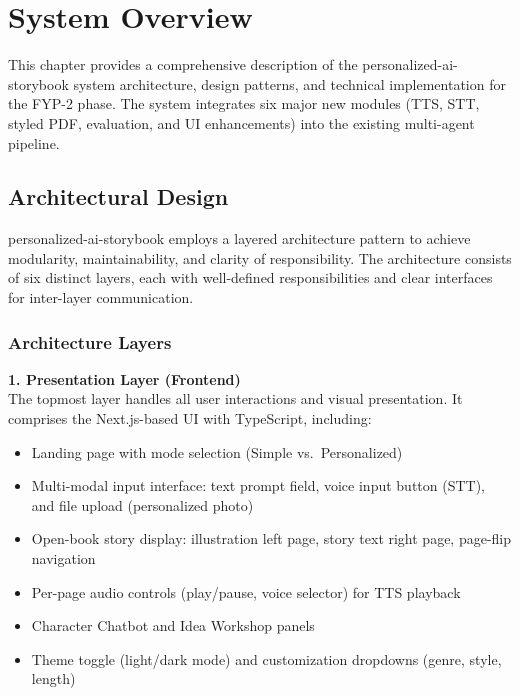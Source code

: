 \chapter{System Overview}
\label{sec:system_overview}

This chapter provides a comprehensive description of the personalized-ai-storybook system architecture, design patterns, and technical implementation for the FYP-2 phase. The system integrates six major new modules (TTS, STT, styled PDF, evaluation, and UI enhancements) into the existing multi-agent pipeline.

\section{Architectural Design}

personalized-ai-storybook employs a layered architecture pattern to achieve modularity, maintainability, and clarity of responsibility. The architecture consists of six distinct layers, each with well-defined responsibilities and clear interfaces for inter-layer communication.

\subsection{Architecture Layers}

\textbf{1. Presentation Layer (Frontend)} \\
The topmost layer handles all user interactions and visual presentation. It comprises the Next.js-based UI with TypeScript, including:
\begin{itemize}
    \item Landing page with mode selection (Simple vs.\ Personalized)
    \item Multi-modal input interface: text prompt field, voice input button (STT), and file upload (personalized photo)
    \item Open-book story display: illustration left page, story text right page, page-flip navigation
    \item Per-page audio controls (play/pause, voice selector) for TTS playback
    \item Character Chatbot and Idea Workshop panels
    \item Theme toggle (light/dark mode) and customization dropdowns (genre, style, length)
\end{itemize}

